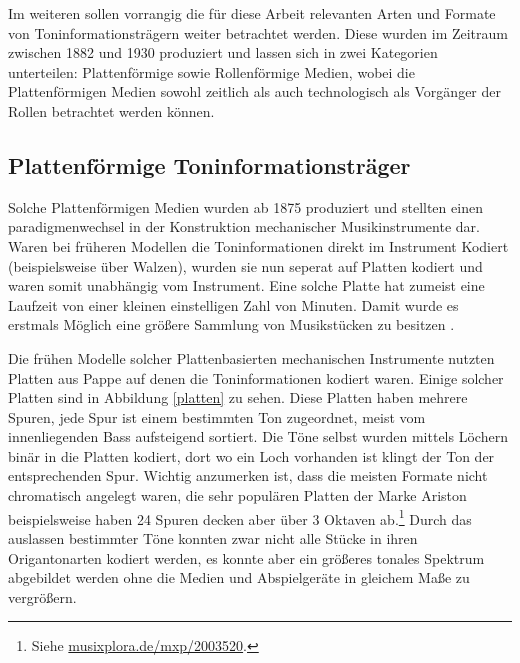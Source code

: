 Im weiteren sollen vorrangig die für diese Arbeit relevanten Arten und Formate von Toninformationsträgern weiter betrachtet werden.
Diese wurden im Zeitraum zwischen 1882 und 1930 produziert und lassen sich in zwei Kategorien unterteilen: Plattenförmige sowie Rollenförmige Medien, wobei die Plattenförmigen Medien sowohl zeitlich als auch technologisch als Vorgänger der Rollen betrachtet werden können.

\subsection{Plattenförmige Toninformationsträger}

Solche Plattenförmigen Medien wurden ab 1875 produziert und stellten einen paradigmenwechsel in der Konstruktion mechanischer Musikinstrumente dar.
Waren bei früheren Modellen die Toninformationen direkt im Instrument Kodiert (beispielsweise über Walzen), wurden sie nun seperat auf Platten kodiert und waren somit unabhängig vom Instrument.
Eine solche Platte hat zumeist eine Laufzeit von einer kleinen einstelligen Zahl von Minuten.
Damit wurde es erstmals Möglich eine größere Sammlung von Musikstücken zu besitzen \parencite[]{mgg_mechanische}.

Die frühen Modelle solcher Plattenbasierten mechanischen Instrumente nutzten Platten aus Pappe auf denen die Toninformationen kodiert waren.
Einige solcher Platten sind in Abbildung \ref{platten} zu sehen.
Diese Platten haben mehrere Spuren, jede Spur ist einem bestimmten Ton zugeordnet, meist vom innenliegenden Bass aufsteigend sortiert.
Die Töne selbst wurden mittels Löchern binär in die Platten kodiert, dort wo ein Loch vorhanden ist klingt der Ton der entsprechenden Spur.
Wichtig anzumerken ist, dass die meisten Formate nicht chromatisch angelegt waren, die sehr populären Platten der Marke Ariston beispielsweise haben 24 Spuren decken aber über 3 Oktaven ab.\footnote{Siehe \href{https://musixplora.de/mxp/2003520}{musixplora.de/mxp/2003520}.}
Durch das auslassen bestimmter Töne konnten zwar nicht alle Stücke in ihren Origantonarten kodiert werden, es konnte aber ein größeres tonales Spektrum abgebildet werden ohne die Medien und Abspielgeräte in gleichem Maße zu vergrößern.


